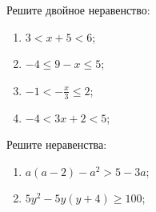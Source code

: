 \documentclass[algebra,twocolumn]{pum}
\renewcommand\le\leqslant
\renewcommand\ge\geqslant
\begin{document}
\begin{exercises}
\begin{question}
  \end{question}
  \vspace{-4mm}
  \begin{question}
    Решите двойное неравенство:
    \begin{multicols}{2}
      \begin{enumerate}[label=\arabic*),nosep]
        \item $3<x+5<6$;
        \item $-4\le9-x\le5$;
        \item $-1<-\frac{x}{3}\le2$;
        \item $-4<3x+2<5$;
      \end{enumerate}
    \end{multicols}
  \end{question}
  \vspace{-4mm}
  \begin{question}
    Решите неравенства:
    \begin{multicols}{2}
      \begin{enumerate}[label=\arabic*),nosep]
        \item $a(a-2)-a^2>5-3a$;
        \item $5y^2-5y(y+4)\ge100$;
      \end{enumerate}
    \end{multicols}
  \end{question}
\end{exercises}
\end{document}
